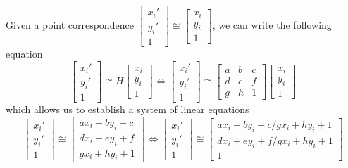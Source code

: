Given a point correspondence $\begin{bmatrix} {x_i}' \\ {y_i}' \\ 1 \end{bmatrix} \cong \begin{bmatrix} x_i \\ y_i \\ 1 \end{bmatrix}$, we can write the following equation \[
    \begin{bmatrix} {x_i}' \\ {y_i}' \\ 1 \end{bmatrix} \cong H \begin{bmatrix} x_i \\ y_i \\ 1 \end{bmatrix}
    \iff
    \begin{bmatrix} {x_i}' \\ {y_i}' \\ 1 \end{bmatrix} \cong \begin{bmatrix} a & b & c \\ d & e & f \\ g & h & 1 \end{bmatrix} \begin{bmatrix} x_i \\ y_i \\ 1 \end{bmatrix}
\] which allows us to establish a system of linear equations \[
    \begin{bmatrix} {x_i}' \\ {y_i}' \\ 1 \end{bmatrix} \cong 
    \begin{bmatrix} ax_i + by_i + c \\ dx_i + ey_i + f \\ gx_i + hy_i + 1 \end{bmatrix} 
    \iff
    \begin{bmatrix} {x_i}' \\ {y_i}' \\ 1 \end{bmatrix} \cong 
    \begin{bmatrix} {ax_i + by_i + c}/{gx_i + hy_i + 1} \\ {dx_i + ey_i + f}/{gx_i + hy_i + 1} \\ 1 \end{bmatrix} 
\]

